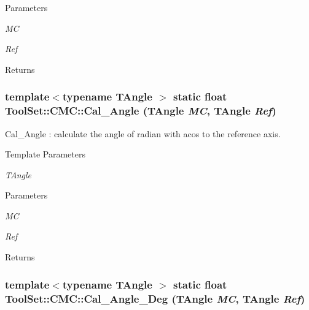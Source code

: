\begin{DoxyParams}{Parameters}
\item[{\em MC}]\item[{\em Ref}]\end{DoxyParams}
\begin{DoxyReturn}{Returns}

\end{DoxyReturn}
\hypertarget{classToolSet_1_1CMC_a0637a061bf4ecd9084b794023cc11816}{
\subsubsection[{Cal\_\-Angle}]{\setlength{\rightskip}{0pt plus 5cm}template$<$typename TAngle $>$ static float ToolSet::CMC::Cal\_\-Angle (TAngle {\em MC}, \/  TAngle {\em Ref})}}
\label{classToolSet_1_1CMC_a0637a061bf4ecd9084b794023cc11816}


Cal\_\-Angle : calculate the angle of radian with acos to the reference axis. 
\begin{DoxyTemplParams}{Template Parameters}
\item[{\em TAngle}]\end{DoxyTemplParams}

\begin{DoxyParams}{Parameters}
\item[{\em MC}]\item[{\em Ref}]\end{DoxyParams}
\begin{DoxyReturn}{Returns}

\end{DoxyReturn}
\hypertarget{classToolSet_1_1CMC_a58389b8e6c06afb39377d6d078e5616f}{
\subsubsection[{Cal\_\-Angle\_\-Deg}]{\setlength{\rightskip}{0pt plus 5cm}template$<$typename TAngle $>$ static float ToolSet::CMC::Cal\_\-Angle\_\-Deg (TAngle {\em MC}, \/  TAngle {\em Ref})}}
\label{classToolSet_1_1CMC_a58389b8e6c06afb39377d6d078e5616f}


